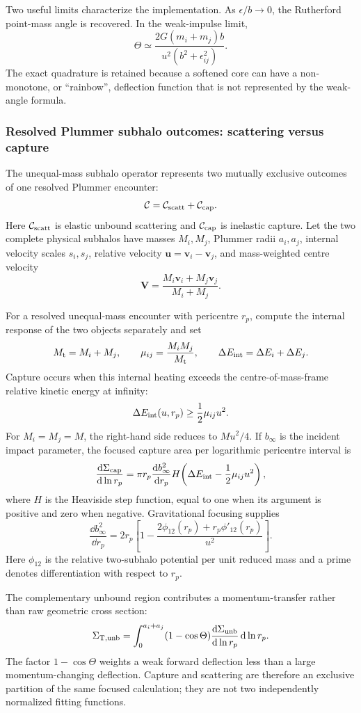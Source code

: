 Two useful limits characterize the implementation.  As \(\epsilon/b\to0\), the
Rutherford point-mass angle is recovered.  In the weak-impulse limit,
\[
 \Theta\simeq
 \frac{2G(m_i+m_j)b}
 {u^2(b^2+\epsilon_{ij}^2)}.
\]
The exact quadrature is retained because a softened core can have a
non-monotone, or ``rainbow'', deflection function that is not represented by
the weak-angle formula.

\subsubsection{Resolved Plummer subhalo outcomes: scattering versus capture}
\label{sec:wpic-subhalo-capture}

The unequal-mass subhalo operator represents two mutually exclusive
outcomes of one resolved Plummer encounter:
\[
 {\cal C}={\cal C}_{\rm scatt}+{\cal C}_{\rm cap}.
\]
Here \({\cal C}_{\rm scatt}\) is elastic unbound scattering and
\({\cal C}_{\rm cap}\) is inelastic capture.  Let the two complete physical
subhalos have masses \(M_i,M_j\), Plummer radii \(a_i,a_j\), internal
velocity scales \(s_i,s_j\), relative velocity
\(\bm u=\bm v_i-\bm v_j\), and mass-weighted centre velocity
\[
 \bm V=\frac{M_i\bm v_i+M_j\bm v_j}{M_i+M_j}.
\]

For a resolved unequal-mass encounter with pericentre \(r_p\), compute the
internal response of the two objects separately and set
\[
 M_{\rm t}=M_i+M_j,\qquad
 \mu_{ij}=\frac{M_iM_j}{M_{\rm t}},\qquad
 \Delta E_{\rm int}=\Delta E_i+\Delta E_j.
\]
Capture occurs when this internal heating exceeds the
centre-of-mass-frame relative kinetic energy at infinity:
\[
 \Delta E_{\rm int}(u,r_p)\ge\frac12\mu_{ij}u^2.
\]
For \(M_i=M_j=M\), the right-hand side reduces to \(Mu^2/4\).
If \(b_\infty\) is the incident impact parameter, the focused capture area per
logarithmic pericentre interval is
\[
 \frac{\mathrm d\Sigma_{\rm cap}}{\mathrm d\ln r_p}
 =\pi r_p\frac{\mathrm d b_\infty^2}{\mathrm d r_p}
 H\!\left(\Delta E_{\rm int}-\frac12\mu_{ij}u^2\right),
\]
where \(H\) is the Heaviside step function, equal to one when its argument is
positive and zero when negative.  Gravitational focusing supplies
\[
 \frac{\dd b_\infty^2}{\dd r_p}
 =2r_p\left[
 1-\frac{2\phi_{12}(r_p)+r_p\phi'_{12}(r_p)}{u^2}
 \right].
\]
Here \(\phi_{12}\) is the relative two-subhalo potential per unit reduced mass
and a prime denotes differentiation with respect to \(r_p\).

The complementary unbound region contributes a momentum-transfer rather than
raw geometric cross section:
\[
 \Sigma_{{\rm T},{\rm unb}}
 =\int_0^{a_i+a_j}(1-\cos\Theta)
 \frac{\mathrm d\Sigma_{\rm unb}}{\mathrm d\ln r_p}\,\mathrm d\ln r_p .
\]
The factor \(1-\cos\Theta\) weights a weak forward deflection less than a large
momentum-changing deflection.  Capture and scattering are therefore an
exclusive partition of the same focused calculation; they are not two
independently normalized fitting functions.

